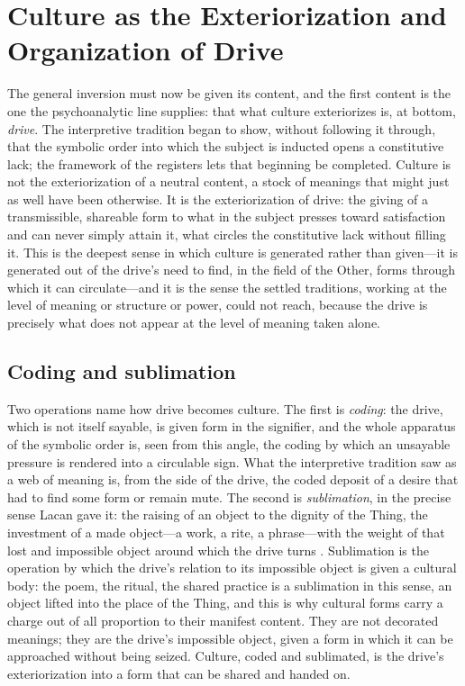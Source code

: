 \section{Culture as the Exteriorization and Organization of Drive}
\label{p24:sec:drive}

\noindent
The general inversion must now be given its content, and the first content is the one the psychoanalytic line supplies: that what culture exteriorizes is, at bottom, \emph{drive}. The interpretive tradition began to show, without following it through, that the symbolic order into which the subject is inducted opens a constitutive lack; the framework of the registers lets that beginning be completed. Culture is not the exteriorization of a neutral content, a stock of meanings that might just as well have been otherwise. It is the exteriorization of drive: the giving of a transmissible, shareable form to what in the subject presses toward satisfaction and can never simply attain it, what circles the constitutive lack without filling it. This is the deepest sense in which culture is generated rather than given---it is generated out of the drive's need to find, in the field of the Other, forms through which it can circulate---and it is the sense the settled traditions, working at the level of meaning or structure or power, could not reach, because the drive is precisely what does not appear at the level of meaning taken alone.

\subsection*{Coding and sublimation}

Two operations name how drive becomes culture. The first is \emph{coding}: the drive, which is not itself sayable, is given form in the signifier, and the whole apparatus of the symbolic order is, seen from this angle, the coding by which an unsayable pressure is rendered into a circulable sign. What the interpretive tradition saw as a web of meaning is, from the side of the drive, the coded deposit of a desire that had to find some form or remain mute. The second is \emph{sublimation}, in the precise sense Lacan gave it: the raising of an object to the dignity of the Thing, the investment of a made object---a work, a rite, a phrase---with the weight of that lost and impossible object around which the drive turns \parencite{lacan1992vii}. Sublimation is the operation by which the drive's relation to its impossible object is given a cultural body: the poem, the ritual, the shared practice is a sublimation in this sense, an object lifted into the place of the Thing, and this is why cultural forms carry a charge out of all proportion to their manifest content. They are not decorated meanings; they are the drive's impossible object, given a form in which it can be approached without being seized. Culture, coded and sublimated, is the drive's exteriorization into a form that can be shared and handed on.


